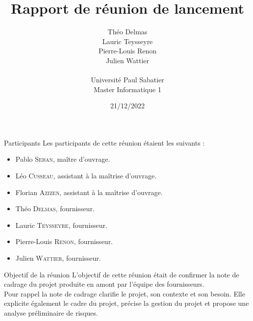 \documentclass[]{article}
\title{Rapport de réunion de lancement}
\author{
    Théo Delmas\\
    Lauric Teysseyre\\
    Pierre-Louis Renon\\
    Julien Wattier\\
    \\
    Université Paul Sabatier\\
    Master Informatique 1\\
   }
\date{21/12/2022}
\begin{document}
    \maketitle
    \newpage
    \tableofcontents
    \newpage

    \begin{section}{Participants}
        Les participants de cette réunion étaient les suivants : 
        \begin{itemize}
            \item Pablo \textsc{Seban}, maître d'ouvrage.
            \item Léo \textsc{Cusseau}, assistant à la maîtrise d'ouvrage.
            \item Florian \textsc{Azizen}, assistant à la maîtrise d'ouvrage.
            \item Théo \textsc{Delmas}, fournisseur.
            \item Lauric \textsc{Teysseyre}, fournisseur.
            \item Pierre-Louis \textsc{Renon}, fournisseur.
            \item Julien \textsc{Wattier}, fournisseur.
        \end{itemize}
    \end{section}

    \begin{section}{Objectif de la réunion}
        L'objectif de cette réunion était de confirmer la note de cadrage du projet produite en amont par l'équipe des 
        fournisseurs.\\
        Pour rappel la note de cadrage clarifie le projet, son contexte et son besoin. Elle explicite également le cadre du 
        projet, précise la gestion du projet et propose une analyse préliminaire de risques.
    \end{section}
\end{document}
